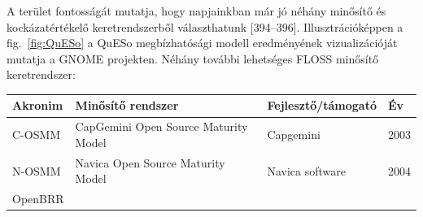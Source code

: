 \documentclass[12pt,magyar,a4paper,oneside]{scrreprt}
\begin{document}
A terület fontosságát mutatja, hogy napjainkban már jó néhány minősítő
és kockázatértékelő keretrendszerből választhatunk {[}394--396{]}.
Illusztrációképpen a fig.~\ref{fig:QuESo} a QuESo megbízhatósági modell
eredményének vizualizációját mutatja a GNOME projekten. Néhány további
lehetséges FLOSS minősítő keretrendszer:

\begin{longtable}[]{@{}llll@{}}
\toprule
\begin{minipage}[b]{0.14\columnwidth}\raggedright
Akronim\strut
\end{minipage} & \begin{minipage}[b]{0.49\columnwidth}\raggedright
Minősítő rendszer\strut
\end{minipage} & \begin{minipage}[b]{0.21\columnwidth}\raggedright
Fejlesztő/támogató\strut
\end{minipage} & \begin{minipage}[b]{0.04\columnwidth}\raggedright
Év\strut
\end{minipage}\tabularnewline
\midrule
\endhead
\begin{minipage}[t]{0.14\columnwidth}\raggedright
C-OSMM\strut
\end{minipage} & \begin{minipage}[t]{0.49\columnwidth}\raggedright
CapGemini Open Source Maturity Model\strut
\end{minipage} & \begin{minipage}[t]{0.21\columnwidth}\raggedright
Capgemini\strut
\end{minipage} & \begin{minipage}[t]{0.04\columnwidth}\raggedright
2003\strut
\end{minipage}\tabularnewline
\begin{minipage}[t]{0.14\columnwidth}\raggedright
N-OSMM\strut
\end{minipage} & \begin{minipage}[t]{0.49\columnwidth}\raggedright
Navica Open Source Maturity Model\strut
\end{minipage} & \begin{minipage}[t]{0.21\columnwidth}\raggedright
Navica software\strut
\end{minipage} & \begin{minipage}[t]{0.04\columnwidth}\raggedright
2004\strut
\end{minipage}\tabularnewline
\begin{minipage}[t]{0.14\columnwidth}\raggedright
OpenBRR\strut

\end{minipage}
\end{longtable}
\end{document}
